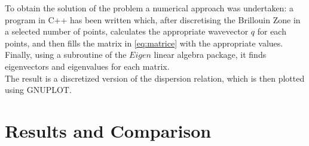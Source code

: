 \documentclass{article}
\begin{document}
\medskip

To obtain the solution of the problem a numerical approach was undertaken: a program in C++ has been written which, after discretising the Brillouin Zone in a selected number of points, calculates the appropriate wavevector $q$ for each points, and then fills the matrix in \autoref{eq:matrice} with the appropriate values. Finally, using a subroutine of the $Eigen$ linear algebra package, it finds eigenvectors and eigenvalues for each matrix.\\
The result is a discretized version of the dispersion relation, which is then plotted using GNUPLOT. \par


\section{Results and Comparison} 
\end{document}
